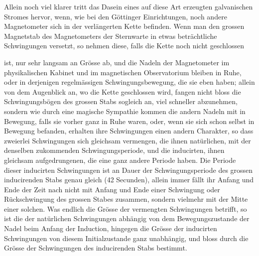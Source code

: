 Allein noch viel klarer tritt das Dasein eines auf diese Art erzeugten galvanischen Stromes hervor, wenn, wie bei den Göttinger Einrichtungen, noch andere Magnetometer sich in der verlängerten Kette befinden. Wenn man den grossen Magnetstab des Magnetometers der Sternwarte in etwas beträchtliche Schwingungen versetzt, so nehmen diese, falls die Kette noch nicht geschlossen
\par\clearpage
{}
\noindent ist, nur sehr langsam an Grösse ab, und die Nadeln der Magnetometer im physikalischen Kabinet und im magnetischen Observatorium bleiben in Ruhe, oder in derjenigen regelmässigen Schwingungsbewegung, die sie eben haben; allein von dem Augenblick an, wo die Kette geschlossen wird, fangen nicht bloss die Schwingungsbögen des grossen Stabs sogleich an, viel schneller abzunehmen, sondern wie durch eine magische Sympathie kommen die andern Nadeln mit in Bewegung, falls sie vorher ganz in Ruhe waren, oder, wenn sie sich schon selbst in Bewegung befanden, erhalten ihre Schwingungen einen andern Charakter, so dass zweierlei Schwingungen sich gleichsam vermengen, die ihnen natürlichen, mit der denselben zukommenden Schwingungsperiode, und die inducirten, ihnen gleichsam aufgedrungenen, die eine ganz andere Periode haben. Die Periode dieser inducirten Schwingungen ist an Dauer der Schwingungsperiode des grossen inducirenden Stabs genau gleich (42 Secunden), allein immer fällt ihr Anfang und Ende der Zeit nach nicht mit Anfang und Ende einer Schwingung oder Rückschwingung des grossen Stabes zusammen, sondern vielmehr mit der Mitte einer solchen. Was endlich die Grösse der vermengten Schwingungen betrifft, so ist die der natürlichen Schwingungen abhängig von dem Bewegungszustande der Nadel beim Anfang der Induction, hingegen die Grösse der inducirten Schwingungen von diesem Initialzustande ganz unabhängig, und bloss durch die Grösse der Schwingungen des inducirenden Stabs bestimmt.

